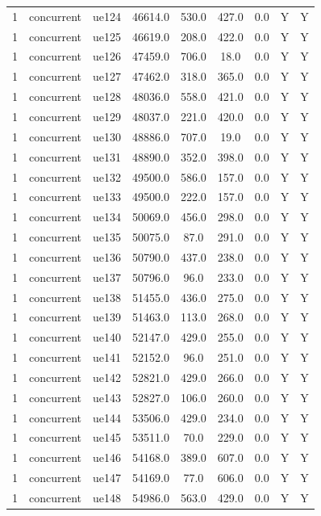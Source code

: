 \begin{table}[ht]
\begin{tabular}{|c|c|c|c|c|c|c|c|c|}
1 & concurrent & ue124 & 46614.0 & 530.0 & 427.0 & 0.0 & Y & Y \\
1 & concurrent & ue125 & 46619.0 & 208.0 & 422.0 & 0.0 & Y & Y \\
1 & concurrent & ue126 & 47459.0 & 706.0 & 18.0 & 0.0 & Y & Y \\
1 & concurrent & ue127 & 47462.0 & 318.0 & 365.0 & 0.0 & Y & Y \\
1 & concurrent & ue128 & 48036.0 & 558.0 & 421.0 & 0.0 & Y & Y \\
1 & concurrent & ue129 & 48037.0 & 221.0 & 420.0 & 0.0 & Y & Y \\
1 & concurrent & ue130 & 48886.0 & 707.0 & 19.0 & 0.0 & Y & Y \\
1 & concurrent & ue131 & 48890.0 & 352.0 & 398.0 & 0.0 & Y & Y \\
1 & concurrent & ue132 & 49500.0 & 586.0 & 157.0 & 0.0 & Y & Y \\
1 & concurrent & ue133 & 49500.0 & 222.0 & 157.0 & 0.0 & Y & Y \\
1 & concurrent & ue134 & 50069.0 & 456.0 & 298.0 & 0.0 & Y & Y \\
1 & concurrent & ue135 & 50075.0 & 87.0 & 291.0 & 0.0 & Y & Y \\
1 & concurrent & ue136 & 50790.0 & 437.0 & 238.0 & 0.0 & Y & Y \\
1 & concurrent & ue137 & 50796.0 & 96.0 & 233.0 & 0.0 & Y & Y \\
1 & concurrent & ue138 & 51455.0 & 436.0 & 275.0 & 0.0 & Y & Y \\
1 & concurrent & ue139 & 51463.0 & 113.0 & 268.0 & 0.0 & Y & Y \\
1 & concurrent & ue140 & 52147.0 & 429.0 & 255.0 & 0.0 & Y & Y \\
1 & concurrent & ue141 & 52152.0 & 96.0 & 251.0 & 0.0 & Y & Y \\
1 & concurrent & ue142 & 52821.0 & 429.0 & 266.0 & 0.0 & Y & Y \\
1 & concurrent & ue143 & 52827.0 & 106.0 & 260.0 & 0.0 & Y & Y \\
1 & concurrent & ue144 & 53506.0 & 429.0 & 234.0 & 0.0 & Y & Y \\
1 & concurrent & ue145 & 53511.0 & 70.0 & 229.0 & 0.0 & Y & Y \\
1 & concurrent & ue146 & 54168.0 & 389.0 & 607.0 & 0.0 & Y & Y \\
1 & concurrent & ue147 & 54169.0 & 77.0 & 606.0 & 0.0 & Y & Y \\
1 & concurrent & ue148 & 54986.0 & 563.0 & 429.0 & 0.0 & Y & Y \\

\end{tabular}
\end{table}
